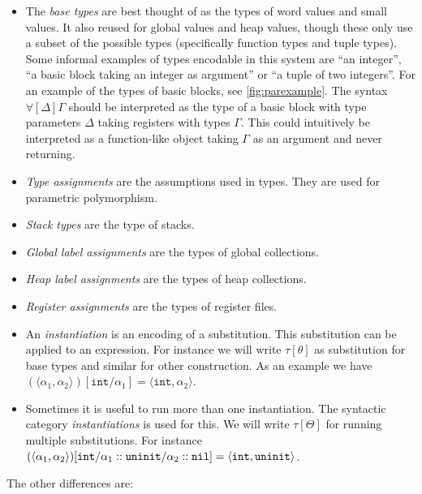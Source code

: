 \begin{itemize}
\item The \emph{base types} are best thought of as the types of word values and
  small values. It also reused for global values and heap values, though these
  only use a subset of the possible types (specifically function types and tuple
  types). Some informal examples of types encodable in this system are ``an
  integer'', ``a basic block taking an integer as argument'' or ``a tuple of two
  integers''. For an example of the types of basic blocks, see
  \cref{fig:parexample}. The syntax $\forall[\Delta] \Gamma$ should be
  interpreted as the type of a basic block with type parameters $\Delta$ taking
  registers with types $\Gamma$. This could intuitively be interpreted as a
  function-like object taking $\Gamma$ as an argument and never returning.
\item \emph{Type assignments} are the assumptions used in types. They are used
  for parametric polymorphism.
\item \emph{Stack types} are the type of stacks.
\item \emph{Global label assignments} are the types of global collections.
\item \emph{Heap label assignments} are the types of heap collections.
\item \emph{Register assignments} are the types of register files.
\item An \emph{instantiation} is an encoding of a substitution. This
  substitution can be applied to an expression. For instance we will write
  $\tau[\theta]$ as substitution for base types and similar for other
  construction. As an example we have
  $(\langle \alpha_1, \alpha_2 \rangle)[\mathtt{int} / \alpha_1] = \langle
  \mathtt{int}, \alpha_2 \rangle$.
\item Sometimes it is useful to run more than one instantiation. The syntactic
  category \emph{instantiations} is used for this. We will write $\tau[\Theta]$
  for running multiple substitutions.  For instance
  $(\langle \alpha_1, \alpha_2 \rangle)[\mathtt{int} / \alpha_1 :: \mathtt{uninit} /
  \alpha_2 :: \mathtt{nil}] = \langle \mathtt{int}, \mathtt{uninit} \rangle$.
\end{itemize}

The other differences are:

